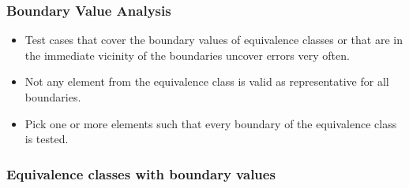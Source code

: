 
\begin{frame}
\frametitle{Boundary Value Analysis}
\begin{itemize}
  \item Test cases that cover the boundary values of equivalence classes or that are in the \alert{immediate vicinity of the boundaries} uncover errors very often.
  \item \alert{Not any element} from the equivalence class is valid as representative for all boundaries.
  \item Pick one or more \alert{elements such that every boundary} of the equivalence class is tested.
\end{itemize}
\end{frame}


\begin{frame}
\frametitle{Equivalence classes with boundary values}
\begin{center}
\end{center}
\end{frame}